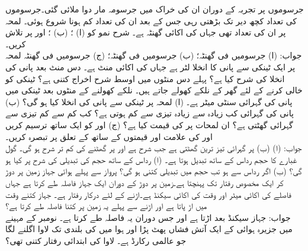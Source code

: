 جرسوموں پر تجربہ کے دوران ان کی خراک میں جرسومہ مار دوا ملائی گئی۔جرسوموں کی تعداد کچھ دیر تک بڑھتی رہی جس کے بعد ان کی تعداد کم ہونا شروع ہوئی۔ لمحہ  پر ان کی تعداد  تھی جہاں  کی اکائی گھنٹہ ہے۔ شرح نمو کو (ا) ؛ (ب) ؛ اور  پر تلاش کریں۔  \\
جواب:\quad
(ا)  جرسومیں فی گھنٹہ؛ (ب)  جرسومیں فی گھنٹہ؛ (ج)  جرسومیں فی گھنٹہ
لمحہ  پر ایک ٹینکی سے پانی کا انخلا  لٹر ہے جہاں  کی اکائی منٹ ہے۔ دس منٹ بعد پانی کی انخلا کی شرح کیا ہے؟ پہلے دس منٹوں میں اوسط شرح اخراج کتنی ہے؟ 
ٹینکی کو خالی کرنے کے لئے گھر کے نلکے کھولے جاتے ہیں۔ نلکے کھولنے کے  منٹوں بعد ٹینکی میں پانی کی گہرائی  سنٹی میٹر ہے۔ (ا) لمحہ  پر ٹینکی سے پانی کی انخلا  کیا ہو گی؟ (ب) پانی کی گہرائی کب زیادہ سے زیادہ تیزی سے کم ہوتی ہے؟ کب کم سے کم تیزی سے گہرائی گھٹتی ہے؟ ان لمحات پر  کی قیمت کیا ہے؟ (ج)  اور  کو ایک ساتھ ترسیم کریں اور  کی علامت اور قیمتوں کے ساتھ  کے تعلق پر تبصرہ کریں۔\\
جواب:\quad
(ا)  (ب)  پر گہرائی تیز ترین گھٹتی ہے  جب شرح  ہے اور  پر گھٹنے کی کم تر شرح  ہو گی۔ 
گول غبارے کا حجم   رداس  کے ساتھ تبدیل ہوتا ہے۔ (ا) رداس کے ساتھ حجم کی تبدیلی کی شرح  پر کیا ہو گی؟ (ب) اگر رداس  سے  ہو تب حجم میں تبدیلی کتنی ہو گی؟
پرواز سے پہلے ہوائی جہاز زمین پر دوڑ کر ایک مخصوص رفتار تک پہنچتا ہے۔زمین پر دوڑ کے دوران ایک جہاز  فاصلہ طے کرتا ہے جہاں فاصلے کی اکائی میٹر اور وقت کی اکائی سیکنڈ ہے۔اڑنے کے لئے درکار رفتار  ہے۔ جہاز کتنے وقت میں اڑ پاتا ہے اور اڑنے سے پہلے یہ زمین پر کتنا فاصلہ طے کرتا ہے؟\\
جواب:\quad
 جہاز  سیکنڈ بعد اڑتا ہے اور جس دوران یہ  فاصلہ طے کرتا ہے۔
  نومبر کے مہینے میں جزیرہ ہوائی کے ایک آتش فشاں پھٹ پڑا اور ہوا میں  کی بلندی تک لاوا اگلنے لگا جو عالمی رکارڈ ہے۔ لاوا کی ابتدائی رفتار کتنی تھی؟  

